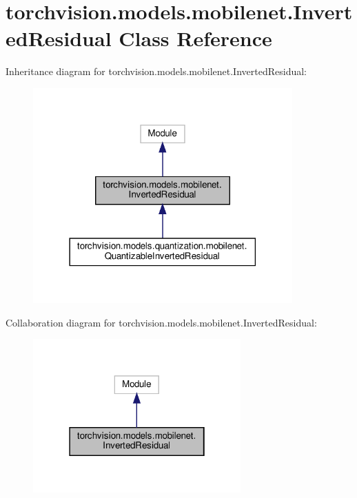 \hypertarget{classtorchvision_1_1models_1_1mobilenet_1_1InvertedResidual}{}\section{torchvision.\+models.\+mobilenet.\+Inverted\+Residual Class Reference}
\label{classtorchvision_1_1models_1_1mobilenet_1_1InvertedResidual}


Inheritance diagram for torchvision.\+models.\+mobilenet.\+Inverted\+Residual\+:
\nopagebreak
\begin{figure}[H]
\begin{center}
\leavevmode
\includegraphics[width=282pt]{classtorchvision_1_1models_1_1mobilenet_1_1InvertedResidual__inherit__graph}
\end{center}
\end{figure}


Collaboration diagram for torchvision.\+models.\+mobilenet.\+Inverted\+Residual\+:
\nopagebreak
\begin{figure}[H]
\begin{center}
\leavevmode
\includegraphics[width=226pt]{classtorchvision_1_1models_1_1mobilenet_1_1InvertedResidual__coll__graph}
\end{center}
\end{figure}
